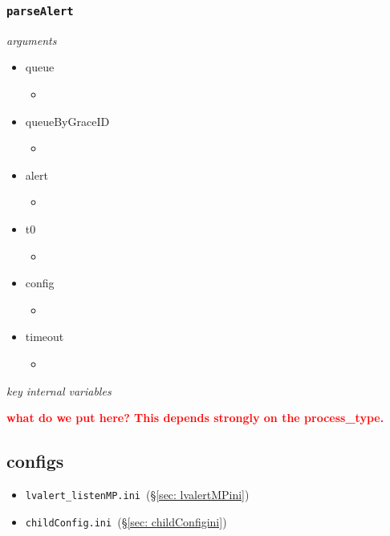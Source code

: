 \documentclass{article}
\newcommand{\FIXME}[1]{\textcolor{red}{\textbf{#1}}}
\newcommand{\parseAlert}{\texttt{parseAlert}~}
\newcommand{\lvalertMPini}{\texttt{lvalert\_listenMP.ini}~}
\newcommand{\childConfigini}{\texttt{childConfig.ini}~}
\begin{document}

\subsubsection{\parseAlert}
\label{sec: parseAlert}

\vspace{0.5cm}
\noindent
\textit{arguments}

\begin{itemize}
    \item{queue
        \begin{itemize}
            \item{}
        \end{itemize}
         }
    \item{queueByGraceID
        \begin{itemize}
            \item{}
        \end{itemize}
         }
    \item{alert
        \begin{itemize}
            \item{}
        \end{itemize}
         }
    \item{t0
        \begin{itemize}
            \item{}
        \end{itemize}
         }
    \item{config
        \begin{itemize}
            \item{}
        \end{itemize}
         }
    \item{timeout
        \begin{itemize}
            \item{}
        \end{itemize}
         }
\end{itemize}

\noindent
\textit{key internal variables}

\FIXME{what do we put here? This depends strongly on the process\_type.}


\subsection{configs}
\label{sec: configs}

\begin{itemize}
    \item{\lvalertMPini (\S\ref{sec: lvalertMPini})}
    \item{\childConfigini (\S\ref{sec: childConfigini})}
\end{itemize}
\end{document}
